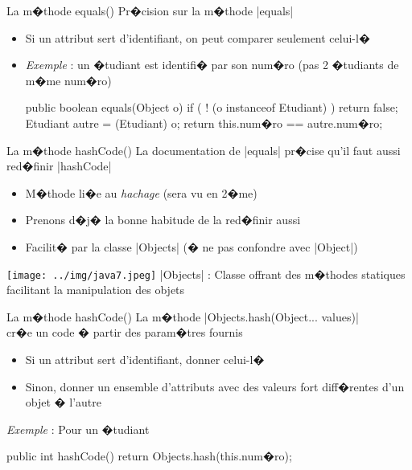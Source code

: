 \begin{frame}[fragile]{La m�thode equals()}
Pr�cision sur la m�thode \java|equals|
\begin{itemize}
\item Si un attribut sert d'identifiant, on peut comparer seulement celui-l�
\item \emph{Exemple} : un �tudiant est identifi� par son num�ro
(pas 2 �tudiants de m�me num�ro)
\begin{Java}
  public boolean equals(Object o) {
    if ( ! (o instanceof Etudiant) ) return false;
    Etudiant autre = (Etudiant) o;
    return this.num�ro ==  autre.num�ro;
  }
\end{Java}
\end{itemize}
\end{frame}


\begin{frame}[fragile]{La m�thode hashCode()}
La documentation de \java|equals| pr�cise qu'il faut aussi red�finir \java|hashCode|
\begin{itemize}
\item M�thode li�e au \emph{hachage} (sera vu en 2�me)
\item Prenons d�j� la bonne habitude de la red�finir aussi
\item Facilit� par la classe \java|Objects| (� ne pas confondre avec \java|Object|)
\end{itemize}
\medskip
\texttt{[image: ../img/java7.jpeg]}
\java|Objects| : Classe offrant des m�thodes statiques facilitant la manipulation des objets
\end{frame}

\begin{frame}[fragile]{La m�thode hashCode()}
La m�thode \java|Objects.hash(Object... values)| 
\\cr�e un code � partir des param�tres fournis
\begin{itemize}
\item Si un attribut sert d'identifiant, donner celui-l�
\item Sinon, donner un ensemble d'attributs avec des valeurs fort diff�rentes d'un objet � l'autre
\end{itemize}
\medskip
\emph{Exemple} : Pour un �tudiant
\begin{Java}
  public int hashCode() {
    return Objects.hash(this.num�ro);
  }
\end{Java}
\end{frame}

